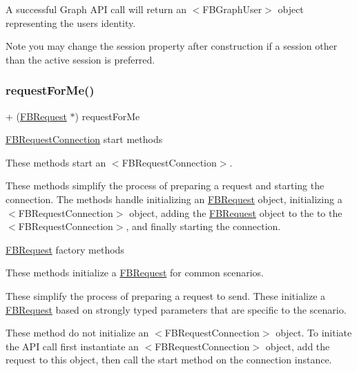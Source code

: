 A successful Graph A\+PI call will return an $<$\+F\+B\+Graph\+User$>$ object representing the user\textquotesingle{}s identity.

Note you may change the session property after construction if a session other than the active session is preferred. \mbox{\label{interfaceFBRequest_a1a8fb083c2d09cbbc5ae9afd33e2381f}} 
\subsubsection{\texorpdfstring{request\+For\+Me()}{requestForMe()}\hspace{0.1cm}{\footnotesize\ttfamily [2/5]}}
{\footnotesize\ttfamily + (\hyperlink{interfaceFBRequest}{F\+B\+Request} $\ast$) request\+For\+Me \begin{DoxyParamCaption}{ }\end{DoxyParamCaption}}

\hyperlink{interfaceFBRequestConnection}{F\+B\+Request\+Connection} start methods

These methods start an $<$\+F\+B\+Request\+Connection$>$.

These methods simplify the process of preparing a request and starting the connection. The methods handle initializing an {\ttfamily \hyperlink{interfaceFBRequest}{F\+B\+Request}} object, initializing a $<$\+F\+B\+Request\+Connection$>$ object, adding the {\ttfamily \hyperlink{interfaceFBRequest}{F\+B\+Request}} object to the to the $<$\+F\+B\+Request\+Connection$>$, and finally starting the connection.

\hyperlink{interfaceFBRequest}{F\+B\+Request} factory methods

These methods initialize a {\ttfamily \hyperlink{interfaceFBRequest}{F\+B\+Request}} for common scenarios.

These simplify the process of preparing a request to send. These initialize a {\ttfamily \hyperlink{interfaceFBRequest}{F\+B\+Request}} based on strongly typed parameters that are specific to the scenario.

These method do not initialize an $<$\+F\+B\+Request\+Connection$>$ object. To initiate the A\+PI call first instantiate an $<$\+F\+B\+Request\+Connection$>$ object, add the request to this object, then call the {\ttfamily start} method on the connection instance.

